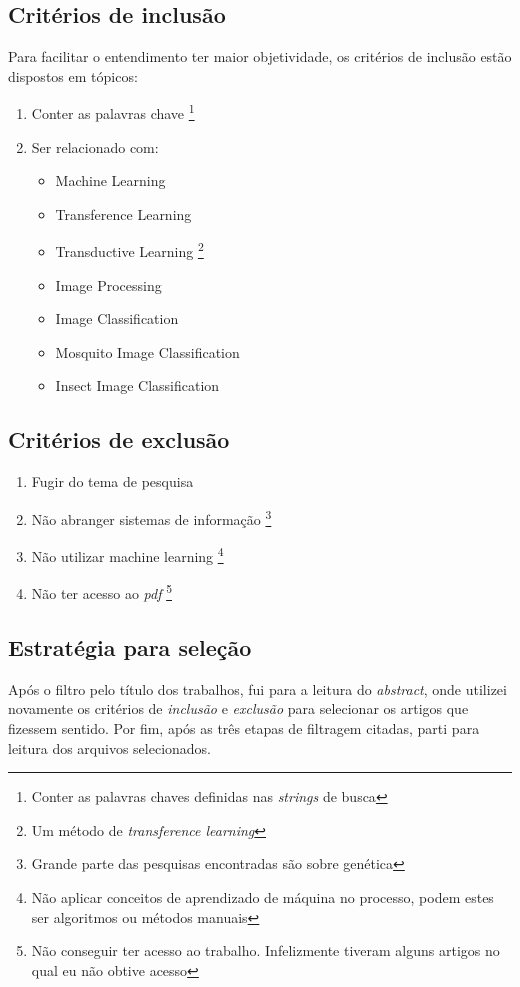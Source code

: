 \documentclass[conference]{IEEEtran}
\begin{document}
\subsection{Critérios de inclusão}
\label{cap:crit_inclusao}
Para facilitar o entendimento ter maior objetividade, os critérios de inclusão estão dispostos em tópicos:
\begin{enumerate}
    \item Conter as palavras chave \footnote{Conter as palavras chaves definidas nas \emph{strings} de busca}
    \item Ser relacionado com: 
    \begin{itemize}
        \item Machine Learning
        \item Transference Learning
        \item Transductive Learning \footnote{Um método de \emph{transference learning}}
        \item Image Processing
        \item Image Classification
        \item Mosquito Image Classification
        \item Insect Image Classification
    \end{itemize}
\end{enumerate}

\subsection{Critérios de exclusão}
\label{cap:crit_exclusao}
\begin{enumerate}
    \item Fugir do tema de pesquisa
    \item Não abranger sistemas de informação \footnote{Grande parte das pesquisas encontradas são sobre genética}
    \item Não utilizar machine learning \footnote{Não aplicar conceitos de aprendizado de máquina no processo, podem estes ser algoritmos ou métodos manuais}
    \item Não ter acesso ao \emph{pdf} \footnote{Não conseguir ter acesso ao trabalho. Infelizmente tiveram alguns artigos no qual eu não obtive acesso}
\end{enumerate}

\subsection{Estratégia para seleção}
Após o filtro pelo título dos trabalhos, fui para a leitura do \emph{abstract}, onde utilizei novamente os critérios de \emph{inclusão} e \emph{exclusão} para selecionar os artigos que fizessem sentido. Por fim, após as três etapas de filtragem citadas, parti para leitura dos arquivos selecionados.
\end{document}
